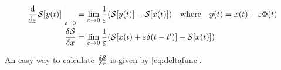 \begin{align}
    \dv{\varepsilon} \action [y(t)]\bigg|_{\varepsilon = 0} &= \lim_{\varepsilon \to 0} \frac{1}{\varepsilon}(\action[y(t)] - \action[x(t)])\quad \text{where} \quad y(t) = x(t) + \varepsilon \Phi(t)\\
    \fdv{\action}{x}&= \lim_{\varepsilon \to 0} \frac{1}{\varepsilon}(\action[x(t) + \varepsilon \delta (t-t')] - \action[x(t)])\label{eq:deltafunc}
\end{align}{}

An easy way to calculate $\fdv{\action}{x}$ is given by \cref{eq:deltafunc}.





